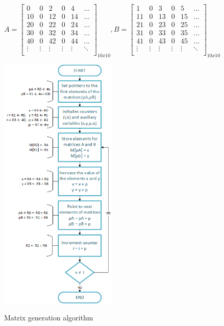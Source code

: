 \documentclass[]{article}
\begin{document}
\[
	A=
	\begin{bmatrix}
	0 & 0 & 2 & 0 & 4 &  \dots  \\
	10 & 0 & 12 & 0 & 14 & \dots  \\
	20 & 0 & 22 & 0 & 24 & \dots  \\
	30 & 0 & 32 & 0 & 34 & \dots  \\
	40 & 0 & 42 & 0 & 44 & \dots  \\
	\vdots & \vdots & \vdots & \vdots & \vdots & \ddots \\
	\end{bmatrix}_{10x10},
	B=
	\begin{bmatrix}
	1 & 0 & 3 & 0 & 5 &  \dots  \\
	11 & 0 & 13 & 0 & 15 & \dots  \\
	21 & 0 & 23 & 0 & 25 & \dots  \\
	31 & 0 & 33 & 0 & 35 & \dots  \\
	41 & 0 & 43 & 0 & 45 & \dots  \\
	\vdots & \vdots & \vdots & \vdots & \vdots & \ddots \\
	\end{bmatrix}_{10x10}
\]

\begin{figure}[H]
	\caption{Matrix generation algorithm}
	\centering
	\includegraphics[width=0.5\textwidth]{gen_algorithm}
	\label{fig:12}
\end{figure}
\end{document}
